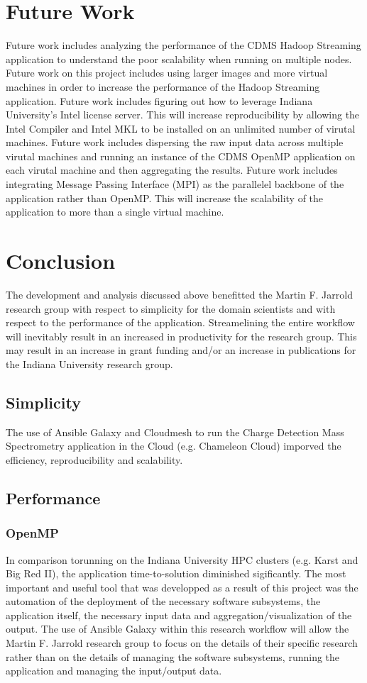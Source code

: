 \documentclass[9pt,twocolumn,twoside]{../../styles/osajnl}
\begin{document}
\section{Future Work} \label{future}
Future work includes analyzing the performance of the CDMS Hadoop
Streaming application to understand the poor scalability when running
on multiple nodes.  Future work on this project includes using larger
images and more virtual machines in order to increase the performance
of the Hadoop Streaming application. Future work includes figuring out
how to leverage Indiana University's Intel license server. This will
increase reproducibility by allowing the Intel Compiler and Intel MKL
to be installed on an unlimited number of virutal machines. Future
work includes dispersing the raw input data across multiple virutal
machines and running an instance of the CDMS OpenMP application on
each virutal machine and then aggregating the results. Future work
includes integrating Message Passing Interface (MPI) as the parallelel
backbone of the application rather than OpenMP. This will increase the
scalability of the application to more than a single virtual machine.

\section{Conclusion} \label{conclusion}
The development and analysis discussed above benefitted the Martin
F. Jarrold research group with respect to simplicity for the domain
scientists and with respect to the performance of the
application. Streamelining the entire workflow will inevitably result
in an increased in productivity for the research group. This may
result in an increase in grant funding and/or an increase in
publications for the Indiana University research group.

\subsection{Simplicity} \label{simplicity}
The use of Ansible Galaxy and Cloudmesh to run the Charge Detection
Mass Spectrometry application in the Cloud (e.g. Chameleon Cloud)
imporved the efficiency, reproducibility and scalability.

\subsection{Performance} \label{performance}
\subsubsection{OpenMP}
In comparison torunning on the Indiana University HPC clusters
(e.g. Karst and Big Red II), the application time-to-solution
diminished sigificantly. The most important and useful tool that was
developped as a result of this project was the automation of the
deployment of the necessary software subsystems, the application
itself, the necessary input data and aggregation/visualization of the
output. The use of Ansible Galaxy within this research workflow will
allow the Martin F. Jarrold research group to focus on the details of
their specific research rather than on the details of managing the
software subsystems, running the application and managing the
input/output data.
\end{document}
